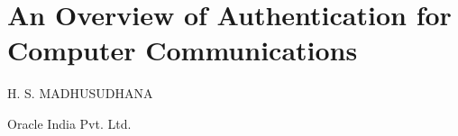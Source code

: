 \chapter{An Overview of Authentication for Computer Communications}

\thispagestyle{empty}

\begin{center}
\uppercase{H. S. Madhusudhana}

\vskip -6pt

Oracle India Pvt. Ltd.
\end{center}


\bigskip

\noindent{}

\newpage

